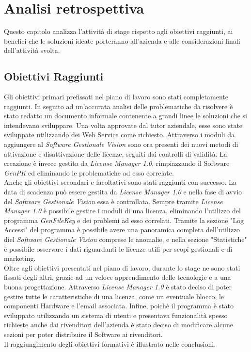 
\chapter{Analisi retrospettiva}
\label{cap:analisi-retrospettiva}
Questo capitolo analizza l'attività di stage rispetto agli obiettivi raggiunti, ai benefici che le soluzioni ideate porteranno all'azienda e alle considerazioni finali dell'attività svolta.


\section{Obiettivi Raggiunti}

Gli obiettivi primari prefissati nel piano di lavoro sono stati completamente raggiunti. In seguito ad un'accurata analisi delle problematiche da risolvere è stato redatto un documento informale contenente a grandi linee le soluzioni che si intendevano sviluppare. Una volta approvate dal tutor aziendale, esse sono state sviluppate utilizzando dei Web Service come richiesto. Attraverso i moduli da aggiungere al \textit{Software Gestionale Vision} sono ora presenti dei nuovi metodi di attivazione e disattivazione delle licenze, seguiti dai controlli di validità. La creazione è invece gestita da \textit{License Manager 1.0}, rimpiazzando il Software \textit{GenPK} ed eliminando le problematiche ad esso correlate.
\\Anche gli obiettivi secondari e facoltativi sono stati raggiunti con successo. La data di scadenza può essere gestita da \textit{License Manager 1.0} e nella fase di avvio del \textit{Software Gestionale Vision} essa è controllata. Sempre tramite \textit{License Manager 1.0} è possibile gestire i moduli di una licenza, eliminando l'utilizzo del programma \textit{GenFileKey} e dei problemi ad esso correlati. Tramite la sezione "Log Accessi" del programma è possibile avere una panoramica completa dell'utilizzo diel \textit{Software Gestionale Vision} comprese le anomalie, e nella sezione "Statistiche" è possibile osservare i dati riguardanti le licenze utili per scopi gestionali e di marketing.
\\Oltre agli obiettivi presentati nel piano di lavoro, durante lo stage ne sono stati fissati degli altri, grazie ad un veloce apprendimento delle tecnologie e a una buona progettazione. Attraverso \textit{License Manager 1.0} è stato deciso di poter gestire tutte le caratteristiche di una licenza, come un eventuale blocco, le componenti Hardware e l'email associata. Infine, poichè il programma è stato sviluppato utilizzando un sistema di utenti e presentava funzionalità spesso richieste anche dai rivenditori dell'azienda è stato deciso di modificare alcune sezioni per poter distribuire il Software ai rivenditori.
\\Il raggiungimento degli obiettivi formativi è illustrato nelle conclusioni.

